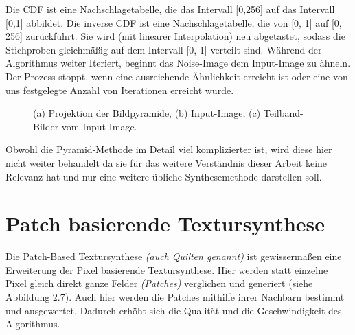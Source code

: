 \documentclass[12pt, a4paper,twoside,openright]{report} %
\begin{document}
Die CDF ist eine Nachschlagetabelle, die das Intervall {[0,256]} auf das Intervall {[0,1]} abbildet.
Die inverse CDF ist eine Nachschlagetabelle, die von {[0, 1]} auf {[0, 256]} zurückführt.
Sie wird {(mit linearer Interpolation)} neu abgetastet,
sodass die Stichproben gleichmäßig auf dem Intervall {[0, 1]} verteilt sind. \cite{Heeger}
\newline
Während der Algorithmus weiter Iteriert, beginnt das Noise-Image dem Input-Image zu ähneln.
Der Prozess stoppt, wenn eine ausreichende Ähnlichkeit erreicht ist oder eine von uns festgelegte Anzahl von Iterationen erreicht wurde.

\begin{figure}[H]
    \centering
    \qquad
    \qquad
    \caption{(a) Projektion der Bildpyramide, (b) Input-Image, (c) Teilband-Bilder vom Input-Image.}%
\end{figure}

Obwohl die Pyramid-Methode im Detail viel komplizierter ist,
wird diese hier nicht weiter behandelt da sie für das weitere Verständnis dieser Arbeit keine Relevanz hat und nur eine weitere übliche Synthesemethode darstellen soll.

\section{Patch basierende Textursynthese}

Die Patch-Based Textursynthese \textit{(auch Quilten genannt)} ist gewissermaßen eine Erweiterung der Pixel basierende Textursynthese.
Hier werden statt einzelne Pixel gleich direkt ganze Felder \textit{(Patches)} verglichen und generiert {(siehe Abbildung 2.7)}.
Auch hier werden die Patches mithilfe ihrer Nachbarn bestimmt und ausgewertet.
Dadurch erhöht sich die Qualität und die Geschwindigkeit des Algorithmus.
\end{document}
